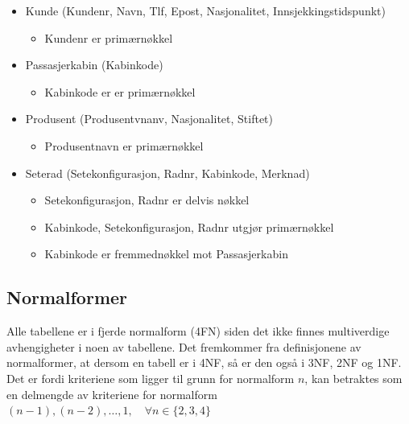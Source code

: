 \documentclass[a4paper,12pt]{article}
\begin{document}
\begin{itemize}
\item Kunde (Kundenr, Navn, Tlf, Epost, Nasjonalitet, Innsjekkingstidspunkt)
\begin{itemize}
\item Kundenr er primærnøkkel
\end{itemize}

\item Passasjerkabin (Kabinkode)
\begin{itemize}
\item Kabinkode er er primærnøkkel
\end{itemize}

\item Produsent (Produsentvnanv, Nasjonalitet, Stiftet)
\begin{itemize}
\item Produsentnavn er primærnøkkel
\end{itemize}

\item Seterad (Setekonfigurasjon, Radnr, Kabinkode, Merknad)
\begin{itemize}
\item Setekonfigurasjon, Radnr er delvis nøkkel
\item Kabinkode, Setekonfigurasjon, Radnr utgjør primærnøkkel
\item Kabinkode er fremmednøkkel mot Passasjerkabin 
\end{itemize}

\end{itemize}

\subsection{Normalformer}
Alle tabellene er i fjerde normalform (4FN) siden det ikke finnes
multiverdige avhengigheter i noen av tabellene. Det fremkommer fra definisjonene
av normalformer, at dersom en tabell er i 4NF, så er den også i 3NF, 2NF og 1NF.
Det er fordi kriteriene som ligger til grunn for normalform $n$, kan betraktes
som en delmengde av kriteriene for normalform $(n-1), (n-2), \ldots, 1, \quad \forall
n \in \{2,3,4\}$
\end{document}
